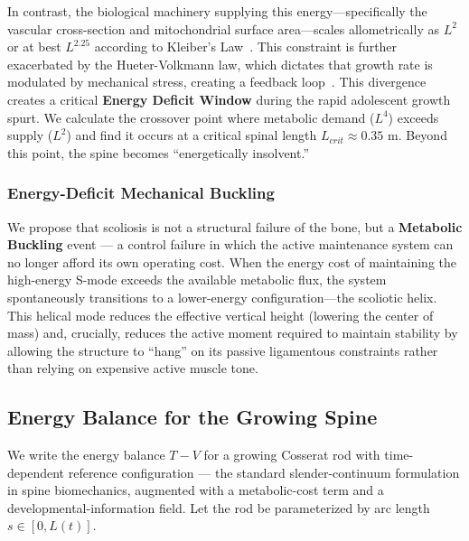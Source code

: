 In contrast, the biological machinery supplying this energy—specifically the vascular cross-section and mitochondrial surface area—scales allometrically as $L^2$ or at best $L^{2.25}$ according to Kleiber's Law~\cite{west1997general, rolfe1997cellular}. This constraint is further exacerbated by the Hueter-Volkmann law, which dictates that growth rate is modulated by mechanical stress, creating a feedback loop~\cite{villemure2009growth}. This divergence creates a critical \textbf{Energy Deficit Window} during the rapid adolescent growth spurt.
We calculate the crossover point where metabolic demand ($L^4$) exceeds supply ($L^2$) and find it occurs at a critical spinal length $L_{crit} \approx 0.35$ m. Beyond this point, the spine becomes ``energetically insolvent.''

\subsubsection{Energy-Deficit Mechanical Buckling}
We propose that scoliosis is not a structural failure of the bone, but a \textbf{Metabolic Buckling} event --- a control failure in which the active maintenance system can no longer afford its own operating cost. When the energy cost of maintaining the high-energy S-mode exceeds the available metabolic flux, the system spontaneously transitions to a lower-energy configuration—the scoliotic helix. This helical mode reduces the effective vertical height (lowering the center of mass) and, crucially, reduces the active moment required to maintain stability by allowing the structure to ``hang'' on its passive ligamentous constraints rather than relying on expensive active muscle tone.

\subsection{Energy Balance for the Growing Spine}

We write the energy balance $T - V$ for a growing Cosserat rod with time-dependent reference configuration --- the standard slender-continuum formulation in spine biomechanics, augmented with a metabolic-cost term and a developmental-information field. Let the rod be parameterized by arc length $s \in [0, L(t)]$.

